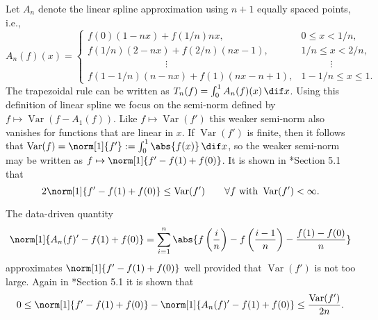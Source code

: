 \documentclass[]{amsart}
\DeclareMathOperator{\Var}{Var}
\theoremstyle{definition}
\theoremstyle{remark}
\begin{document}
Let $A_n$ denote the linear spline approximation using $n+1$ equally spaced points, i.e., 
\begin{equation}
\label{Andef}
A_n(f)(x) = \begin{cases} f(0)(1-nx) + f(1/n)nx, & 0 \le x < 1/n, \\
f(1/n)(2-nx) + f(2/n)(nx-1), & 1/n \le x < 2/n, \\
\qquad \qquad \qquad \qquad \vdots & \qquad \quad \vdots \\
f(1-1/n)(n-nx) + f(1)(nx-n + 1), & 1-1/n \le x \le 1.
\end{cases}
\end{equation}   
The trapezoidal rule can be written as $T_n(f) = \int_0^1 A_n(f)(x) \, \dif x$.  Using this definition of linear spline we focus on the semi-norm defined by $f \mapsto \Var(f-A_1(f))$.  Like $f \mapsto \Var(f')$ this weaker semi-norm also vanishes for functions that are linear in $x$.  If $\Var(f')$ is finite, then it follows that $\Var(f) = \norm[1]{f'}:=\int_0^1 \abs{f(x)} \, \dif x$, so the weaker semi-norm may be written as $f \mapsto \norm[1]{f'-f(1)+f(0)}$.  It is shown in *{Section 5.1} that 
\begin{equation} \label{weaknorm}
2 \norm[1]{f'-f(1)+f(0)} \le \Var(f') \qquad \forall f \text{ with } \Var(f')<\infty.
\end{equation}

The data-driven quantity 
\begin{equation} \label{weaknormalgo}
\norm[1]{A_n(f)'-f(1)+f(0)}= \sum_{i=1}^n \abs{f\left(\frac in \right)-f\left(\frac{i-1}n \right) - \frac{f(1)-f(0)}{n}}
\end{equation}
approximates $\norm[1]{f'-f(1)+f(0)}$ well provided that $\Var(f')$ is not too large. Again in *{Section 5.1} it is shown that 
\begin{equation} \label{errweaknorm}
0 \le \norm[1]{f'-f(1)+f(0)} - \norm[1]{A_n(f)'-f(1)+f(0)} \le \frac{\Var(f')}{2n}.
\end{equation}
\end{document}
